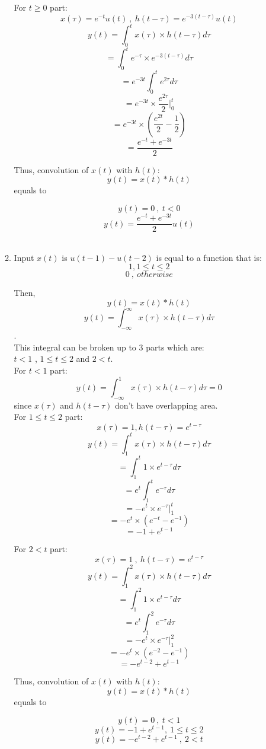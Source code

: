 \documentclass[10pt,a4paper, margin=1in]{article}
\begin{document}
\begin{enumerate}
\begin{enumerate}
    For $t\geq 0$ part:
    \[x(\tau) = e^{-t}u(t)\ ,\ h(t-\tau)=e^{-3(t-\tau)}u(t)\]
    \[y(t) = \int_{0}^{t} x(\tau) \times h(t-\tau) d\tau \]
    \[= \int_{0}^{t} e^{-\tau} \times e^{-3(t-\tau)} d\tau \]
    \[= e^{-3t}\int_{0}^{t} e^{2\tau} d\tau \]
    \[= e^{-3t}\times \frac{e^{2\tau}}{2} \vert_{0}^{t}\]
    \[= e^{-3t}\times (\frac{e^{2t}}{2}-\frac{1}{2})\]
    \[= \frac{e^{-t}+e^{-3t}}{2}\]
    
    Thus, convolution of $x(t)$ with $h(t)$:
    \[y(t)=x(t)*h(t)\]
    equals to
    
    \[y(t)=0\ ,\ t<0 \]
    \[y(t)=\frac{e^{-t}+e^{-3t}}{2}u(t) \] \\
    
     \item %
    Input $x(t)$ is $u(t-1) - u(t-2)$ is equal to a function that is:\\
    \[ 1 , 1\leq t \leq 2 \]
    \[ 0\ ,\ otherwise \]
    
    Then, \[y(t)=x(t)*h(t)\]
    \[y(t) = \int_{-\infty}^{\infty} x(\tau) \times h(t-\tau) d\tau\].\\
    
    This integral can be broken up to 3 parts which are:\\
    $t<1$ , $1\leq t \leq 2$ and $2 < t$.\\
    
    For $t<1$ part:
    \[y(t) = \int_{-\infty}^{1} x(\tau) \times h(t-\tau) d\tau = 0\] since $x(\tau)$ and $h(t-\tau)$ don't have overlapping area.\\
    
    For $1\leq t \leq 2$ part:
    \[x(\tau) = 1, h(t-\tau)=e^{t-\tau} \]
    \[y(t) = \int_{1}^{t} x(\tau) \times h(t-\tau) d\tau \]
    \[= \int_{1}^{t} 1 \times e^{t-\tau} d\tau \]
    \[= e^t\int_{1}^{t} e^{-\tau} d\tau \]
    \[= -e^t\times e^{-\tau} \vert_{1}^{t}\]
    \[= -e^t\times (e^{-t}-e^{-1})\]
    \[= -1 +e^{t-1}\]
    
    For $2 < t$ part:
    \[x(\tau) = 1\ ,\ h(t-\tau)=e^{t-\tau} \]
    \[y(t) = \int_{1}^{2} x(\tau) \times h(t-\tau) d\tau \]
    \[= \int_{1}^{2} 1 \times e^{t-\tau} d\tau \]
    \[= e^t\int_{1}^{2} e^{-\tau} d\tau \]
    \[= -e^t\times e^{-\tau} \vert_{1}^{2}\]
    \[= -e^t\times (e^{-2}-e^{-1})\]
    \[= -e^{t-2} +e^{t-1}\]
    
    Thus, convolution of $x(t)$ with $h(t)$:
    \[y(t)=x(t)*h(t)\]
    equals to
    
    \[y(t)=0\ ,\ t<1 \]
    \[y(t)=-1 +e^{t-1} ,\ 1\leq t \leq 2 \]
    \[y(t)=-e^{t-2} +e^{t-1}\ ,\ 2 < t \]
    

\end{enumerate}
\end{enumerate}
\end{document}
